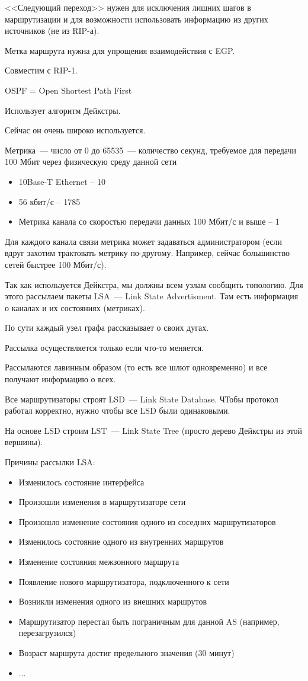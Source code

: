 <<Следующий переход>> нужен для исключения лишних шагов в маршрутизации и для возможности использовать информацию из других источников (не из RIP-а).

Метка маршрута нужна для упрощения взаимодействия с EGP.

Совместим с RIP-1.


OSPF = Open Shortest Path First

Использует алгоритм Дейкстры.

Сейчас он очень широко используется.

Метрика~--- число от 0 до 65535~--- количество секунд, требуемое для передачи 100 Мбит через физическую среду данной сети
\begin{itemize}
    \item 10Base-T Ethernet – 10
    \item 56 кбит/с – 1785
    \item Метрика канала со скоростью передачи данных 100 Мбит/с и выше – 1
\end{itemize}

Для каждого канала связи метрика может задаваться администратором (если вдруг захотим трактовать метрику по-другому. Например, сейчас большинство сетей быстрее 100 Мбит/с).

Так как используется Дейкстра, мы должны всем узлам сообщить топологию. Для этого рассылаем пакеты LSA~--- Link State Advertisment. Там есть информация о каналах и их состояниях (метриках).

По сути каждый узел графа рассказывает о своих дугах.

Рассылка осуществляется только если что-то меняется. 

Рассылаются лавинным образом (то есть все шлют одновременно) и все получают информацию о всех.

Все маршрутизаторы строят LSD~--- Link State Database. ЧТобы протокол работал корректно, нужно чтобы все LSD были одинаковыми.

На основе LSD строим LST~--- Link State Tree (просто дерево Дейкстры из этой вершины).


Причины рассылки LSA:
\begin{itemize}
    \item Изменилось состояние интерфейса
    \item Произошли изменения в маршрутизаторе сети
    \item Произошло изменение состояния одного из соседних маршрутизаторов
    \item Изменилось состояние одного из внутренних маршрутов
    \item Изменение состояния межзонного маршрута
    \item Появление нового маршрутизатора, подключенного к сети
    \item Возникли изменения одного из внешних маршрутов
    \item Маршрутизатор перестал быть пограничным для данной AS (например, перезагрузился)
    \item Возраст маршрута достиг предельного значения (30 минут)
    \item ...
\end{itemize}

